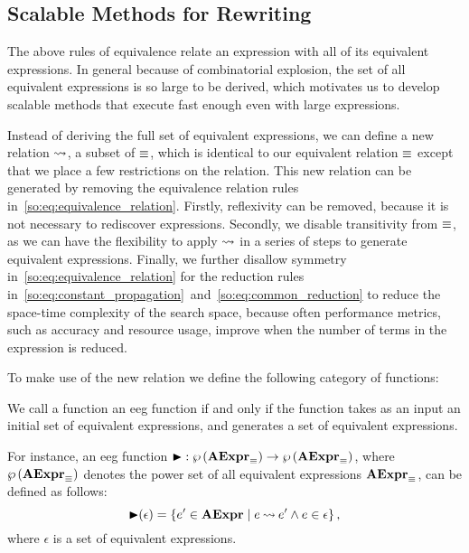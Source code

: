 \subsection{Scalable Methods for Rewriting}
\label{so:sub:scalable}

The above rules of equivalence relate an expression with all of its equivalent
expressions.  In general because of combinatorial explosion, the set of all
equivalent expressions is so large to be derived, which motivates us to develop
scalable methods that execute fast enough even with large expressions.

Instead of deriving the full set of equivalent expressions, we can define
a new relation $\mathbin{\rightsquigarrow}$, a subset of $\equiv$, which is identical to
our equivalent relation $\equiv$ except that we place a few restrictions
on the relation.  This new relation can be generated by removing the
equivalence relation rules in~\eqref{so:eq:equivalence_relation}.  Firstly,
reflexivity can be removed, because it is not necessary to rediscover
expressions.  Secondly, we disable transitivity from $\equiv$, as we
can have the flexibility to apply $\mathbin{\rightsquigarrow}$ in a series of steps
to generate equivalent expressions.  Finally, we further disallow
symmetry in~\eqref{so:eq:equivalence_relation} for the reduction rules
in~\eqref{so:eq:constant_propagation}~and~\eqref{so:eq:common_reduction} to
reduce the space-time complexity of the search space, because often performance
metrics, such as accuracy and resource usage, improve when the number of terms
in the expression is reduced.

To make use of the new relation we define the following category of functions:
\begin{definition}
    We call a function an \gls{eeg} function if and only if the function takes
    as an input an initial set of equivalent expressions, and generates a set
    of equivalent expressions.
\end{definition}

For instance, an \gls{eeg} function $\operatorname{\blacktriangleright}: \wp\left({\mathbf{AExpr}_\equiv}\right) \to
\wp\left({\mathbf{AExpr}_\equiv}\right)$, where $\wp\left({\mathbf{AExpr}_\equiv}\right)$ denotes the power set of all
equivalent expressions $\mathbf{AExpr}_\equiv$, can be defined as follows:
\begin{equation}
    \operatorname{\blacktriangleright}(\epsilon) = \left\{
        e^\prime\in\mathbf{AExpr} \mid
        e \mathbin{\rightsquigarrow} e^\prime \wedge e\in\epsilon\right\},
    \label{so:eq:eqstep}
\end{equation}
where $\epsilon$ is a set of equivalent expressions.

